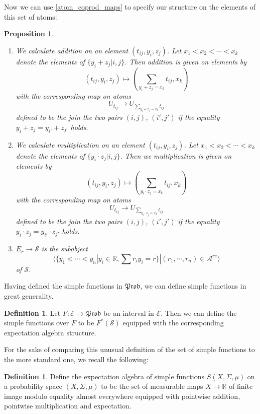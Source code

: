 \documentclass[a4paper]{amsproc}
\theoremstyle{plain}
\newtheorem{proposition}[theorem]{Proposition}
\theoremstyle{definition}
\newtheorem{definition}[theorem]{Definition}
\theoremstyle{remark}
\numberwithin{equation}{section}
\begin{document}
Now we can use \ref{atom_coprod_maps} to specify our structure on the elements of this set of atoms:

\begin{proposition}
    \begin{enumerate}
        \item We calculate addition on an element $(t_{ij}, y_i, z_j)$. Let $x_1 < x_2 < \cdots < x_k$ denote the elements of $\{y_i + z_j | i,j \}$. Then addition is given on elements by
        \[
            (t_{ij},y_i,z_j) \mapsto (\sum_{y_i + z_j = x_k} t_{ij}, x_k) 
        \]
        with the corresponding map on atoms
        \[
            U_{t_{ij}} \to U_{\sum_{y_i + z_j = x_k} t_{ij}}
        \]
        defined to be the join the two pairs $(i,j)$, $(i',j')$ if the equality $y_i + z_j = y_{i'} + z_{j'}$ holds.
        \item We calculate multiplication on an element $(t_{ij}, y_i, z_j)$. Let $x_1 < x_2 < \cdots < x_k$ denote the elements of $\{y_i \cdot z_j | i,j \}$. Then we multiplication is given on elements by
        \[
            (t_{ij},y_i,z_j) \mapsto (\sum_{y_i \cdot z_j = x_k} t_{ij}, x_k) 
        \]
        with the corresponding map on atoms
        \[
            U_{t_{ij}} \to U_{\sum_{y_i \cdot z_j = x_k} t_{ij}}
        \]
        defined to be the join the two pairs $(i,j)$, $(i',j')$ if the equality $y_i \cdot z_j = y_{i'} \cdot z_{j'}$ holds.
        \item $E_r \to \mathcal{S}$ is the subobject
        \[
            \langle \{y_1 < \cdots < y_n | y_i \in \mathbb{R}, \sum r_i y_i = r \} | (r_1, \cdots, r_n) \in \mathcal{A}^{re} \rangle
        \]
        of $\mathcal{S}$.
    \end{enumerate}
\end{proposition}

Having defined the simple functions in $\mathfrak{Prob}$, we can define simple functions in great generality.

\begin{definition}
    Let $F: \mathcal{E} \to \mathfrak{Prob}$ be an interval in $\mathcal{E}$. Then we can define the simple functions over $F$ to be $F^*(\mathcal{S})$ equipped with the corresponding expectation algebra structure.
\end{definition}

For the sake of comparing this unusual definition of the set of simple functions to the more standard one, we recall the following:

\begin{definition}
    Define the expectation algebra of simple functions $S(X,\Sigma, \mu)$ on a probability space $(X, \Sigma, \mu)$ to be the set of measurable maps $X \to \mathbb{R}$ of finite image modulo equality almost everywhere equipped with pointwise addition, pointwise multiplication and expectation.
\end{definition}
\end{document}
